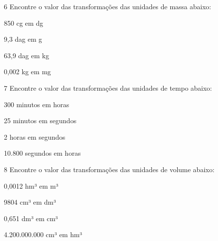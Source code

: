\num{6} Encontre o valor das transformações das unidades de massa abaixo:

\begin{escolha}
\item 850 cg em dg
 \\ 

\item 9,3 dag em g
 \\ 

\item 63,9 dag em kg
 \\ 

\item 0,002 kg em mg
 \\ 
\end{escolha}

\num{7} Encontre o valor das transformações das unidades de tempo abaixo:

\begin{escolha}
\item 300 minutos em horas
 \\

\item 25 minutos em segundos
 \\

\item 2 horas em segundos
 \\

\item 10.800 segundos em horas
 \\
\end{escolha}

\num{8} Encontre o valor das transformações das unidades de volume abaixo:

\begin{escolha}

\item 0,0012 hm³ em m³
 \\

\item 9804 cm³ em dm³
 \\

\item 0,651 dm³ em cm³
 \\

\item 4.200.000.000 cm³ em hm³
 \\

\end{escolha}

